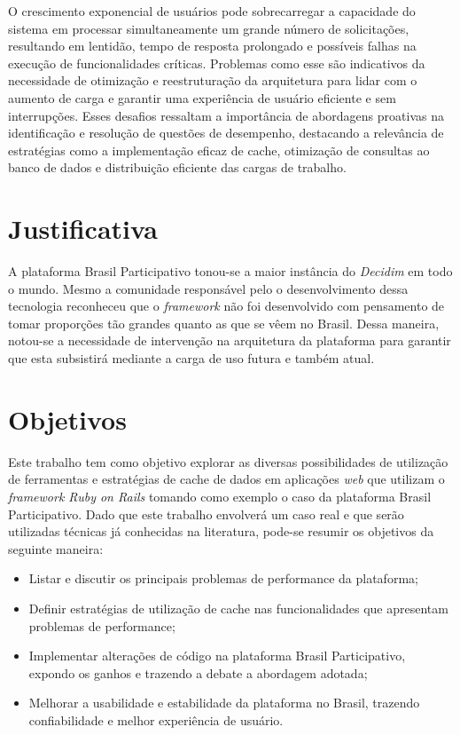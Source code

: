 O crescimento exponencial de usuários pode sobrecarregar a capacidade do sistema em processar simultaneamente um grande número de solicitações, resultando em lentidão, tempo de resposta prolongado e possíveis falhas na execução de funcionalidades críticas. Problemas como esse são indicativos da necessidade de otimização e reestruturação da arquitetura para lidar com o aumento de carga e garantir uma experiência de usuário eficiente e sem interrupções. Esses desafios ressaltam a importância de abordagens proativas na identificação e resolução de questões de desempenho, destacando a relevância de estratégias como a implementação eficaz de cache, otimização de consultas ao banco de dados e distribuição eficiente das cargas de trabalho.

\section{Justificativa}

A plataforma Brasil Participativo tonou-se a maior instância do \textit{Decidim} em todo o mundo. Mesmo a comunidade responsável pelo o desenvolvimento dessa tecnologia reconheceu que o \textit{framework} não foi desenvolvido com pensamento de tomar proporções tão grandes quanto as que se vêem no Brasil. Dessa maneira, notou-se a necessidade de intervenção na arquitetura da plataforma para garantir que esta subsistirá mediante a carga de uso futura e também atual.

\section{Objetivos}

Este trabalho tem como objetivo explorar as diversas possibilidades de utilização de ferramentas e estratégias de cache de dados em aplicações \textit{web} que utilizam o \textit{framework Ruby on Rails} tomando como exemplo o caso da plataforma Brasil Participativo. Dado que este trabalho envolverá um caso real e que serão utilizadas técnicas já conhecidas na literatura, pode-se resumir os objetivos da seguinte maneira:

\begin{itemize}
  \item Listar e discutir os principais problemas de performance da plataforma;
  \item Definir estratégias de utilização de cache nas funcionalidades que apresentam problemas de performance;
  \item Implementar alterações de código na plataforma Brasil Participativo, expondo os ganhos e trazendo a debate a abordagem adotada;
  \item Melhorar a usabilidade e estabilidade da plataforma no Brasil, trazendo confiabilidade e melhor experiência de usuário.
\end{itemize}